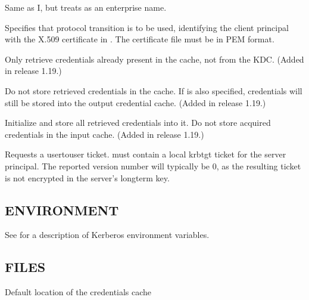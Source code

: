 \documentclass[letterpaper,10pt,english]{sphinxmanual}
\begin{document}
\begin{description}
\sphinxAtStartPar
Same as \sphinxhyphen{}I, but treats  as an enterprise name.

\sphinxAtStartPar
Specifies that protocol transition is to be used, identifying the
client principal with the X.509 certificate in .  The
certificate file must be in PEM format.

\sphinxAtStartPar
Only retrieve credentials already present in the cache, not from
the KDC.  (Added in release 1.19.)

\sphinxAtStartPar
Do not store retrieved credentials in the cache.  If
 is also specified, credentials will still be
stored into the output credential cache.  (Added in release 1.19.)

\sphinxAtStartPar
Initialize  and store all retrieved credentials into it.
Do not store acquired credentials in the input cache.  (Added in
release 1.19.)

\sphinxAtStartPar
Requests a user\sphinxhyphen{}to\sphinxhyphen{}user ticket.   must contain a local
krbtgt ticket for the server principal.  The reported version
number will typically be 0, as the resulting ticket is not
encrypted in the server’s long\sphinxhyphen{}term key.

\end{description}


\subsection{ENVIRONMENT}
\label{\detokenize{user/user_commands/kvno:environment}}
\sphinxAtStartPar
See {\hyperref[\detokenize{user/user_config/kerberos:kerberos-7}]{}} for a description of Kerberos environment
variables.


\subsection{FILES}
\label{\detokenize{user/user_commands/kvno:files}}\begin{description}
\sphinxAtStartPar
Default location of the credentials cache

\end{description}
\end{document}
